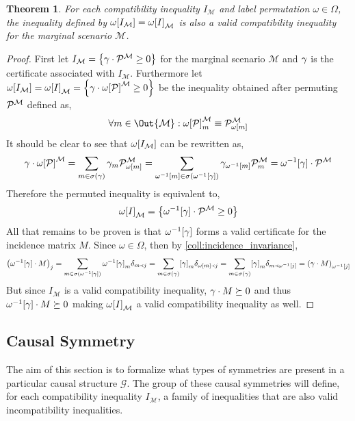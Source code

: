 \documentclass[aps, 10pt, english, twoside, pra, nofootinbib, longbibliography]{revtex4-1}
\theoremstyle{plain}
\newtheorem{theorem}{Theorem}
\theoremstyle{definition}
\theoremstyle{remark}
\newcommand{\graph}{\mathcal{G}}
\newcommand{\ext}{\mathrel{\Yleft}}
\newcommand{\geo}{\omega}
\newcommand{\go}{\Omega}
\newcommand{\mscenario}{\mathcal{M}}
\newcommand{\supp}[1]{\si\br{#1}}
\begin{document}
    \begin{theorem}
        For each compatibility inequality $I_{\mscenario}$ and label permutation $\geo \in \go$, the inequality defined by $\geo\bs{I_{\mscenario}} = \geo\bs{I}_{\mscenario}$ is also a valid compatibility inequality for the marginal scenario $\mscenario$.
    \end{theorem}
    \begin{proof}
        First let $I_{\mscenario} = \bc{\ga \cdot \probvec^{\mscenario} \geq 0}$ for the marginal scenario $\mscenario$ and $\gamma$ is the certificate associated with $I_{\mscenario}$. Furthermore let $\geo\bs{I_{\mscenario}} = \geo\bs{I}_{\mscenario} = \bc{\ga \cdot \geo\bs{\probvec}^{\mscenario} \geq 0}$ be the inequality obtained after permuting $\probvec^{\mscenario}$ defined as,
        \[ \forall m \in \Out{\mscenario} : \geo\bs{\probvec}^{\mscenario}_m \defined \probvec^{\mscenario}_{\geo\bs{m}} \]
        It should be clear to see that $\geo\bs{I_{\mscenario}}$ can be rewritten as,
        \[ \ga \cdot \geo\bs{\probvec}^{\mscenario} = \sum_{m \in \supp{\ga}} \ga_{m} \probvec^{\mscenario}_{\geo\bs{m}} = \sum_{\geo^{-1}\bs{m} \in \supp{\geo^{-1}\bs{\ga}}} \ga_{\geo^{-1}\bs{m}} \probvec^{\mscenario}_{m} = \geo^{-1}\bs{\ga} \cdot \probvec^{\mscenario} \]
        Therefore the permuted inequality is equivalent to,
        \[ \geo\bs{I}_{\mscenario} = \bc{\geo^{-1}\bs{\ga} \cdot \probvec^{\mscenario} \geq 0} \]
        All that remains to be proven is that $\geo^{-1}\bs{\ga}$ forms a valid certificate for the incidence matrix $M$. Since $\geo \in \go$, then by \cref{coll:incidence_invariance},
        \[ \br{\geo^{-1}\bs{\ga} \cdot M}_j = \sum_{m \in \supp{\geo^{-1}\bs{\ga}}} \geo^{-1}\bs{\ga}_m \de_{m\ext j} = \sum_{m \in \supp{\ga}} \bs{\ga}_m \de_{\geo\bs{m}\ext j} = \sum_{m \in \supp{\ga}} \bs{\ga}_m \de_{m\ext \geo^{-1}\bs{j}} = \br{\ga \cdot M}_{\geo^{-1}\bs{j}} \]
        But since $I_{\mscenario}$ is a valid compatibility inequality, $\gamma \cdot M \succeq 0$ and thus $\geo^{-1}\bs{\ga} \cdot M \succeq 0$ making $\geo\bs{I}_{\mscenario}$ a valid compatibility inequality as well.
    \end{proof}

    \subsection{Causal Symmetry}
    The aim of this section is to formalize what types of symmetries are present in a particular causal structure $\graph$. The group of these causal symmetries will define, for each compatibility inequality $I_{\mscenario}$, a family of inequalities that are also valid incompatibility inequalities.
\end{document}
